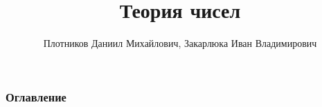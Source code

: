 \documentclass[
	11pt
	   t,
	aspectratio=169
]{beamer}
\title[Теория чисел]{Теория чисел}
\author[Плотников Д.М., Закарлюка И.В. ]{Плотников Даниил Михайлович, Закарлюка Иван Владимирович}
\institute[СПбГУ]{Санкт-Петербургский Государственный Университет}
\date[2025]{}
\begin{document}
\begin{frame}
	\titlepage
\end{frame}

\begin{frame}
	\frametitle{Оглавление}
	\tableofcontents 
\end{frame}





\end{document}
